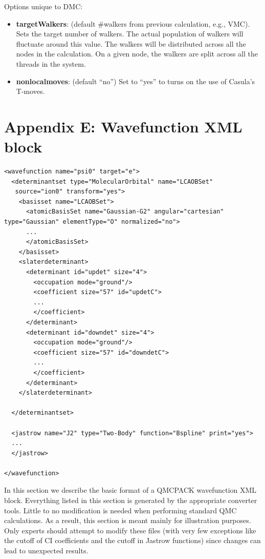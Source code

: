 {Options unique to DMC:
\begin{itemize}
\item{\textbf{targetWalkers}: (default \#walkers from previous calculation, e.g., VMC). Sets the
target number of walkers. The actual population of walkers will fluctuate around this
value. The walkers will be distributed across all the nodes in the calculation. On a
given node, the walkers are split across all the threads in the system.}
\item{\textbf{nonlocalmoves}: (default ``no”) Set to ``yes” to turns on the use of Casula’s T-moves.}
\end{itemize}


\newpage
\section{Appendix E: Wavefunction XML block}\label{sec:lab_adv_mol_wf_appendix}

\begin{lstlisting}[style=QMCPXML,caption=``Basic framework for a single-determinant determinantset XML block.",label=lst:lam_xml_determinantset]
<wavefunction name="psi0" target="e">
  <determinantset type="MolecularOrbital" name="LCAOBSet"
   source="ion0" transform="yes">
    <basisset name="LCAOBSet">
      <atomicBasisSet name="Gaussian-G2" angular="cartesian" type="Gaussian" elementType="O" normalized="no">
      ...
      </atomicBasisSet>
    </basisset>
    <slaterdeterminant>
      <determinant id="updet" size="4">
        <occupation mode="ground"/>
        <coefficient size="57" id="updetC">
        ...
        </coefficient>
      </determinant>
      <determinant id="downdet" size="4">
        <occupation mode="ground"/>
        <coefficient size="57" id="downdetC">
        ...
        </coefficient>
      </determinant>
    </slaterdeterminant>

  </determinantset>

  <jastrow name="J2" type="Two-Body" function="Bspline" print="yes">
  ...
  </jastrow>

</wavefunction>
\end{lstlisting}

In this section we describe the basic format of a QMCPACK wavefunction XML block.
Everything listed in this section is generated by the appropriate converter tools. Little to
no modification is needed when performing standard QMC calculations. As a result, this
section is meant mainly for illustration purposes. Only experts should attempt to modify
these files (with very few exceptions like the cutoff of CI coefficients and the cutoff in Jastrow
functions) since changes can lead to unexpected results.

}
